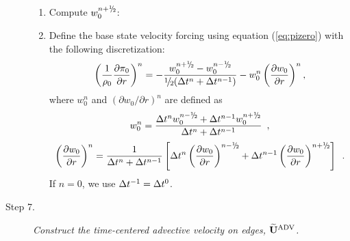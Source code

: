 \begin{description}
\begin{enumerate}
\item Compute $w_0^{n+\myhalf}$:

\item Define the base state velocity forcing using equation (\ref{eq:pizero}) 
with the following discretization:
\begin{equation}
\left ( \frac{1}{\rho_0} \frac{\partial \pi_0}{\partial r} \right )^n = 
-\frac{w_0^{\nph} - w_0^\nmh}{\myhalf(\dt^n+\dt^{n-1})} 
- w_0^n \left(\frac{\partial w_0}{\partial r}\right)^n,
\end{equation}
where $w_0^{n}$ and $(\partial w_0 / \partial r)^{n}$ are defined as
\begin{equation}
w_0^n = \frac{\dt^{n} w_0^{\nmh} + \dt^{n-1} w_0^{\nph}}{\dt^n+\dt^{n-1}}\enskip,
\end{equation}
\begin{equation}
\left(\frac{\partial w_0}{\partial r}\right)^{n} = \frac{1}{\dt^n+\dt^{n-1} } \left [ \dt^{n} \left(\frac{\partial w_0 }{ \partial r}\right)^{\nmh}
+ \dt^{n-1} \left(\frac{\partial w_0 }{ \partial r}\right)^{\nph} \right ] \enskip.
\end{equation}
If $n=0$, we use $\Delta t^{-1} = \Delta t^0$.

\end{enumerate}

\item[Step 7.] {\em Construct the time-centered advective velocity on edges, $\widetilde{\mathbf{U}}^{\mathrm{ADV}}$.}


\end{description}
